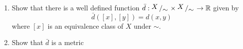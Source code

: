 \begin{defn}
\begin{exr}
\begin{enumerate}
        \item Show that there is a well defined function
          $\bar{d} : \bigslant{X}{\sim} \times \bigslant{X}{\sim} \rightarrow
          \mathbb{R} $ given by
            $$ \bar{d}([x], [y]) = d(x, y) $$
          where $[x]$ is an equivalence class of $X$ under $\sim$.

        \item Show that $\bar{d}$ is a metric
    \end{enumerate}

\end{exr}

\end{defn}
